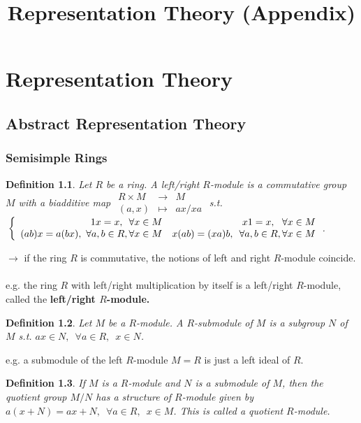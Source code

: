 \documentclass[12pt,letterpaper]{report}
\title{Representation Theory (Appendix)}
\date{}
\newtheorem{definition}{Definition}[section]
\begin{document}
\maketitle

\appendix





\chapter{Representation Theory}
\section{Abstract Representation Theory}
\subsection{Semisimple Rings}
\begin{definition}Let $R$ be a ring. A left/right $R$-module is a commutative group $M$ with a biadditive map $\begin{array}{rrr}R\times M&\rightarrow&M\\(a,x)&\mapsto&ax/xa\end{array}$ s.t. $\\\left\{\begin{array}{rr}1x=x,\,\,\,\forall x\in M&x1=x,\,\,\,\,\forall x\in M\\(ab)x=a(bx),\,\,\forall a,b\in R,\forall x\in M&x(ab)=(xa)b,\,\,\,\forall a,b\in R,\forall x\in M\end{array}\right.$.\end{definition}
$\rightarrow$ if the ring $R$ is commutative, the notions of left and right $R$-module coincide.
\\\\e.g. the ring $R$ with left/right multiplication by itself is a left/right $R$-module, called the \textbf{left/right $R$-module.}
\begin{definition}Let $M$ be a $R$-module. A $R$-submodule of $M$ is a subgroup $N$ of $M$ s.t. $ax\in N,\,\,\,\forall a\in R,\,\,\,x\in N$.\end{definition}
e.g. a submodule of the left $R$-module $M=R$ is just a left ideal of $R$.
\begin{definition}If $M$ is a $R$-module and $N$ is a submodule of $M$, then the quotient group $M/N$ has a structure of $R$-module given by $a(x+N)=ax+N,\,\,\,\forall a\in R,\,\,\,x\in M$. This is called a quotient $R$-module.\end{definition}
\end{document}
